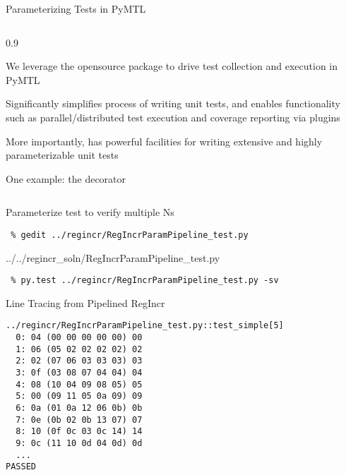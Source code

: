 \begin{frame}{Parameterizing Tests in PyMTL}

\medskip
\begin{cbxcols}
\begin{column}{0.9\tw}
\begin{cbxlist}

  \1 We leverage the opensource  package to drive test
     collection and execution in PyMTL

  \1 Significantly simplifies process of writing unit tests, and enables
     functionality such as parallel/distributed test execution and
     coverage reporting via plugins

  \1 More importantly,  has powerful facilities for writing
     extensive and highly parameterizable unit tests

  \1 One example: the  decorator

\end{cbxlist}
\end{column}
\end{cbxcols}
\end{frame}

\begin{task}\begin{frame}[fragile]{Parameterize test to verify multiple Ns}

\vspace{-0.15in}
\begin{Verbatim}[commandchars=\\\{\}]
 % cd \midtilde/pymtl-tut/build
 % gedit ../regincr/RegIncrParamPipeline_test.py
\end{Verbatim}

%
{../../regincr_soln/RegIncrParamPipeline_test.py}

\begin{Verbatim}
 % py.test ../regincr/RegIncrParamPipeline_test.py -sv
\end{Verbatim}

\end{frame}
\end{task}

\begin{frame}[fragile]{Line Tracing from Pipelined RegIncr}

\begin{Verbatim}
../regincr/RegIncrParamPipeline_test.py::test_simple[5]
  0: 04 (00 00 00 00 00) 00
  1: 06 (05 02 02 02 02) 02
  2: 02 (07 06 03 03 03) 03
  3: 0f (03 08 07 04 04) 04
  4: 08 (10 04 09 08 05) 05
  5: 00 (09 11 05 0a 09) 09
  6: 0a (01 0a 12 06 0b) 0b
  7: 0e (0b 02 0b 13 07) 07
  8: 10 (0f 0c 03 0c 14) 14
  9: 0c (11 10 0d 04 0d) 0d
  ...
PASSED
\end{Verbatim}

\end{frame}

